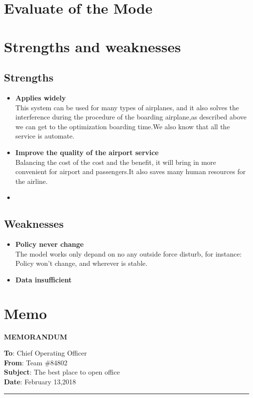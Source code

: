 \documentclass{mcmthesis}
\begin{document}
\section{Evaluate of the Mode}

\section{Strengths and weaknesses}
\lipsum[12]

\subsection{Strengths}
\begin{itemize}
\item \textbf{Applies widely}\\
This  system can be used for many types of airplanes, and it also
solves the interference during  the procedure of the boarding
airplane,as described above we can get to the  optimization
boarding time.We also know that all the service is automate.
\item \textbf{Improve the quality of the airport service}\\
Balancing the cost of the cost and the benefit, it will bring in
more convenient  for airport and passengers.It also saves many
human resources for the airline. \item \textbf{}
\end{itemize}
\cite{chicago}
\subsection{Weaknesses}
\begin{itemize}
\item \textbf{Policy never change}\\
The model works only depand on no any outside force disturb, for instance: Policy won't change, and 
wherever is stable.
\item \textbf{Data insufficient}\\

\end{itemize}
\newpage 
\section{Memo}
\begin{center}
\large {\textbf {MEMORANDUM}}
\end{center}
\textbf {To}: Chief Operating Officer \\
\textbf {From}: Team \#84802 \\
\textbf {Subject}: The best place to open office \\
\textbf {Date}: February 13,2018 \\
\noindent\rule[0.25\baselineskip]{\textwidth}{1pt}
\end{document}
